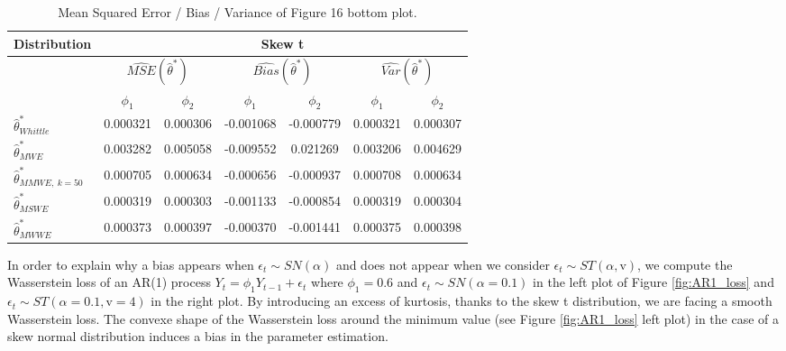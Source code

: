 \documentclass[
  11pt,
]{article}
\begin{document}
\begin{table}[h]
\centering
\begin{tabular}{|l|c|c|c|c|c|c|}
\hline
\multicolumn{1}{|c|}{\textbf{Distribution}} & \multicolumn{6}{c|}{\textbf{Skew t}}                                                                                                                          \\ \hline
\textbf{}                                   & \multicolumn{2}{c|}{$\widehat{MSE}( \hat \theta^*)$} & \multicolumn{2}{c|}{$\widehat{Bias}( \hat \theta^*)$} & \multicolumn{2}{c|}{$\widehat{Var}( \hat \theta^*)$} \\ \hline
                                            & $\phi_1$                 & $\phi_2$                 & $\phi_1$                  & $\phi_2$                 & $\phi_1$                 & $\phi_2$                 \\ \hline
$\hat \theta^*_{Whittle}$                   & 0.000321                  & 0.000306                  & -0.001068                  & -0.000779                  & 0.000321                  & 0.000307                  \\ \hline
$\hat \theta^*_{MWE}$                       & 0.003282                  & 0.005058                  & -0.009552                   & 0.021269                 & 0.003206                  & 0.004629                  \\ \hline
$\hat \theta^*_{MMWE, \ k = 50}$            & 0.000705                  & 0.000634                  & -0.000656                  & -0.000937                  & 0.000708                  & 0.000634                  \\ \hline
$\hat \theta^*_{MSWE}$                      & 0.000319                  & 0.000303                  & -0.001133                  & -0.000854                  & 0.000319                  & 0.000304                  \\ \hline
$\hat \theta^*_{MWWE}$                      & 0.000373                  & 0.000397                  & -0.000370                  & -0.001441                  & 0.000375                  & 0.000398                  \\ \hline
\end{tabular}
\caption{Mean Squared Error / Bias / Variance of Figure 16 bottom plot.}
\label{tab:AR2_skew_t_table}
\end{table}

In order to explain why a bias appears when
\(\epsilon_t \sim SN(\alpha)\) and does not appear when we consider
\(\epsilon_t \sim ST(\alpha, \mathrm{v})\), we compute the Wasserstein
loss of an AR(1) process \(Y_t = \phi_1 Y_{t-1} + \epsilon_t\) where
\(\phi_1 = 0.6\) and \(\epsilon_t \sim SN(\alpha = 0.1)\) in the left
plot of Figure \ref{fig:AR1_loss} and
\(\epsilon_t \sim ST(\alpha = 0.1, \mathrm{v} = 4)\) in the right plot.
By introducing an excess of kurtosis, thanks to the skew t distribution,
we are facing a smooth Wasserstein loss. The convexe shape of the
Wasserstein loss around the minimum value (see Figure \ref{fig:AR1_loss}
left plot) in the case of a skew normal distribution induces a bias in
the parameter estimation.
\end{document}
